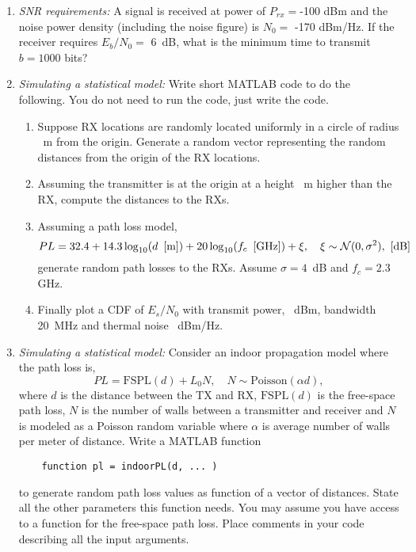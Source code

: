 \documentclass[11pt]{article}
\begin{document}
\begin{enumerate}
\item \emph{SNR requirements:}
A signal is received at power of $P_{rx} = $-100 dBm and the noise power density
(including the noise figure) is $N_0 = $ -170 dBm/Hz.
If the receiver requires $E_b/N_0=$ \SI{6}{dB}, 
what is the minimum time to transmit $b=1000$ bits?


\item \emph{Simulating a statistical model:}
Write short MATLAB code to do the following.  You do not need to run the code,
just write the code.
\begin{enumerate}[label=(\alph*)]
\item Suppose  RX locations are randomly located uniformly
in a circle of radius \, \si{m} from the origin.  
Generate a random vector  representing the  random distances
from the origin of the RX locations.
\item Assuming the transmitter is at the origin at a height \, \si{m} higher than the RX, compute the distances  to the RXs.
\item Assuming a path loss model,
\[
    PL = 32.4 + 14.3\log_{10}(d \mbox{\, [m]}) + 20\log_{10}(f_c \mbox{\, [GHz]})  + \xi,
    \quad \xi \sim \mathcal{N}(0,\sigma^2), \mbox{ [dB]}
\]
generate random path losses to the RXs.   Assume $\sigma = 4$\, \si{dB} and
$f_c = 2.3$\, \si{GHz}.
\item Finally plot a CDF of $E_s/N_0$ with transmit power, \,
\si{dBm}, bandwidth  \SI{20}{MHz} and thermal noise \, \si{dBm/Hz}.
\end{enumerate}



\item \emph{Simulating a statistical model:}
Consider an indoor propagation model where the path loss is,
\[
    PL = \mathrm{FSPL}(d) + L_0 N, \quad N \sim \mathrm{Poisson}(\alpha d),
\]
where $d$ is the distance between the TX and RX,
$\mathrm{FSPL}(d)$ is the free-space path loss, $N$ is
the number of walls between a transmitter and receiver and $N$ is modeled as
a Poisson random variable where $\alpha$ is average number of walls
per meter of distance.
Write a MATLAB function
\begin{lstlisting}
    function pl = indoorPL(d, ... )
\end{lstlisting}
to generate random path loss values as function of a vector of distances.
State all the other parameters this function needs.  You may assume you have
access to a function  for the free-space path loss.
Place comments in your code describing all the input arguments.


\end{enumerate}
\end{document}
